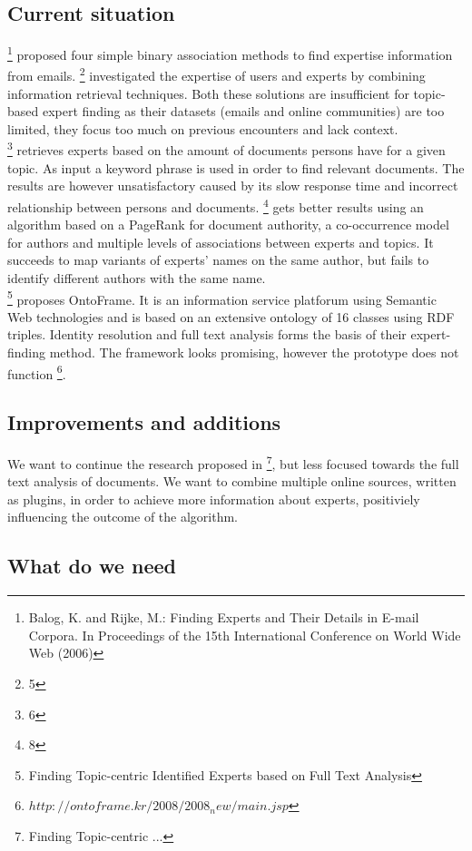 \subsection{Current situation}

\footnote{Balog, K. and Rijke, M.: Finding Experts and Their Details in E-mail Corpora. In Proceedings
of the 15th International Conference on World Wide Web (2006)} proposed four simple binary association methods to find expertise information from emails. \footnote{5} investigated the expertise of users and experts by combining information retrieval techniques. Both these solutions are insufficient for topic-based expert finding as their datasets (emails and online communities) are too limited, they focus too much on previous encounters and lack context.\\
\footnote{6} retrieves experts based on the amount of documents persons have for a given topic. As input a keyword phrase is used in order to find relevant documents. The results are however unsatisfactory caused by its slow response time and incorrect relationship between persons and documents. \footnote{8} gets better results using an algorithm based on a PageRank for document authority, a co-occurrence model for authors and multiple levels of associations between experts and topics. It succeeds to map variants of experts' names on the same author, but fails to identify different authors with the same name.\\
\footnote{Finding Topic-centric Identified Experts based on Full Text Analysis} proposes OntoFrame. It is an information service platforum using Semantic Web technologies and is based on an extensive ontology of 16 classes using RDF triples. Identity resolution and full text analysis forms the basis of their expert-finding method. The framework looks promising, however the prototype does not function \footnote{$http://ontoframe.kr/2008/2008_new/main.jsp$}.

\subsection{Improvements and additions}
We want to continue the research proposed in \footnote{Finding Topic-centric ...}, but less focused towards the full text analysis of documents. We want to combine multiple online sources, written as plugins, in order to achieve more information about experts, positiviely influencing the outcome of the algorithm.

\subsection{What do we need}

